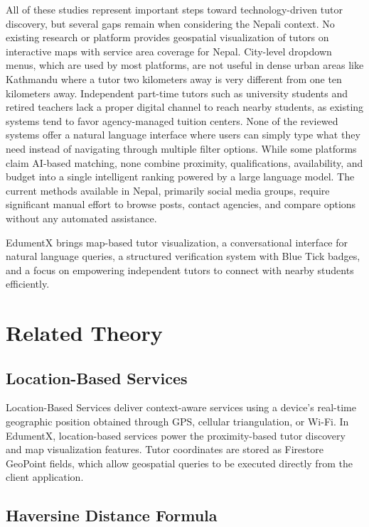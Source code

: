 \documentclass[12pt]{report}
\begin{document}
All of these studies represent important steps toward
technology-driven tutor discovery, but several gaps remain
when considering the Nepali context. No existing research or
platform provides geospatial visualization of tutors on
interactive maps with service area coverage for Nepal.
City-level dropdown menus, which are used by most platforms,
are not useful in dense urban areas like Kathmandu where a
tutor two kilometers away is very different from one ten
kilometers away. Independent part-time tutors such as
university students and retired teachers lack a proper digital
channel to reach nearby students, as existing systems tend to
favor agency-managed tuition centers. None of the reviewed
systems offer a natural language interface where users can
simply type what they need instead of navigating through
multiple filter options. While some platforms claim AI-based
matching, none combine proximity, qualifications, availability,
and budget into a single intelligent ranking powered by a
large language model. The current methods available in Nepal,
primarily social media groups, require significant manual
effort to browse posts, contact agencies, and compare options
without any automated assistance.

EdumentX brings map-based tutor visualization, a
conversational interface for natural language queries, a
structured verification system with Blue Tick badges, and a
focus on empowering independent tutors to connect with nearby
students efficiently.

\section{Related Theory}

\subsection{Location-Based Services}

Location-Based Services deliver context-aware services using a
device's real-time geographic position obtained through GPS,
cellular triangulation, or Wi-Fi. In EdumentX, location-based
services power the proximity-based tutor discovery and map
visualization features. Tutor coordinates are stored as
Firestore GeoPoint fields, which allow geospatial queries to
be executed directly from the client application.

\subsection{Haversine Distance Formula}
\end{document}
